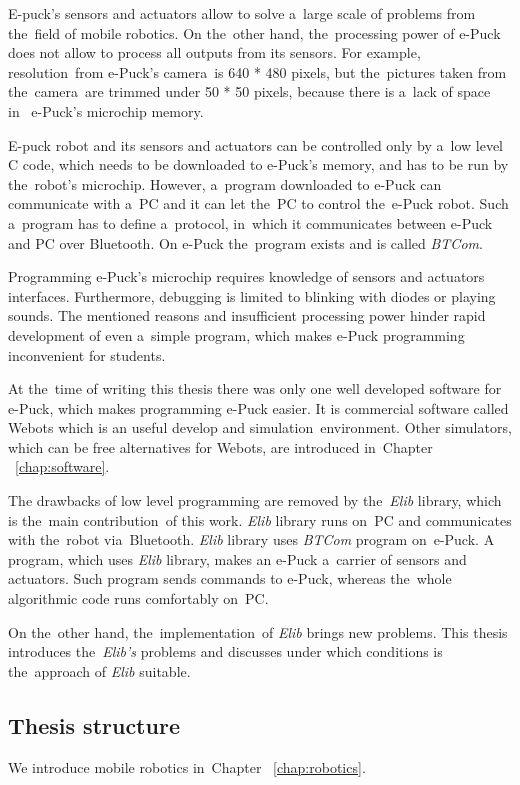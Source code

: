   E-puck's sensors and actuators allow to solve a~large scale of problems from the~field of mobile robotics. 
  On the~other hand, the~processing power of e-Puck does not allow to 
  process all outputs from its sensors. For example, resolution~from e-Puck's camera~is 640 * 480 pixels,
  but the~pictures taken from the~camera~are trimmed under 50 * 50 pixels, because there is a~lack of space in~
   e-Puck's microchip memory.
   
   E-puck robot and its sensors and actuators can be controlled only by a~low level C code,
   which needs to be downloaded to e-Puck's memory, and has to be run by the~robot's microchip.
   However, a~program downloaded to e-Puck can communicate with
   a~PC and it can let the~PC to control the~e-Puck robot. 
   Such a~program has to define a~protocol, 
   in~which it communicates between e-Puck and PC over Bluetooth.
  On e-Puck the~program exists and is called {\it BTCom}. 

  Programming e-Puck's microchip requires knowledge of sensors and actuators interfaces.
  Furthermore, debugging is limited to blinking with diodes or playing sounds.
  The mentioned reasons and insufficient processing power hinder rapid development 
  of even a~simple program, 
  which makes e-Puck programming inconvenient for students.
  
  At the~time of writing this thesis there was only one well developed software for e-Puck, which makes programming e-Puck easier.  It is commercial software called Webots which
   is an useful develop and simulation~environment.
  Other simulators, which can be free alternatives for Webots, are introduced in~Chapter ~\ref{chap:software}.
  
  The drawbacks of low level programming are removed by the~{\it Elib} library, 
  which is the~main contribution~of this work.
  {\it Elib} library runs on~PC and communicates with the~robot via~Bluetooth. 
  {\it Elib} library uses {\it BTCom} program on~e-Puck.
  A program, which uses {\it Elib} library,	makes an e-Puck a~carrier of sensors and actuators. 
  Such program sends commands to e-Puck,
  whereas the~whole algorithmic code runs comfortably on~PC.
  
  On the~other hand, the~implementation~of {\it Elib} brings new problems.
  This thesis introduces the~{\it Elib's} problems and discusses 
  under which conditions is the~approach of {\it Elib} suitable.	
  \subsection*{Thesis structure}
  We introduce mobile robotics in~Chapter ~\ref{chap:robotics}.

